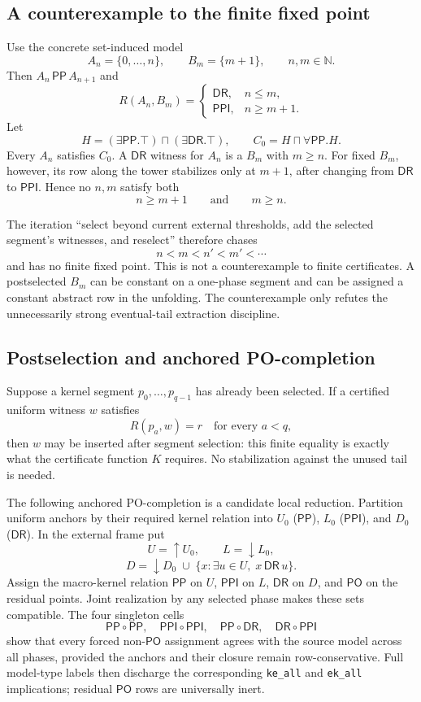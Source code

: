 \documentclass[11pt]{article}
\newcommand{\PP}{\mathsf{PP}}
\newcommand{\PPI}{\mathsf{PPI}}
\newcommand{\PO}{\mathsf{PO}}
\newcommand{\DR}{\mathsf{DR}}
\begin{document}
\subsection{A counterexample to the finite fixed point}

Use the concrete set-induced model
\[
  A_n=\{0,\ldots,n\},\qquad B_m=\{m+1\},\qquad n,m\in\mathbb{N}.
\]
Then $A_n\,\PP\,A_{n+1}$ and
\[
R(A_n,B_m)=
\begin{cases}
\DR,&n\leq m,\\
\PPI,&n\geq m+1.
\end{cases}
\]
Let
\[
  H=(\exists\PP.\top)\sqcap(\exists\DR.\top),\qquad
  C_0=H\sqcap\forall\PP.H.
\]
Every $A_n$ satisfies $C_0$. A $\DR$ witness for $A_n$ is a $B_m$ with $m\geq n$.
For fixed $B_m$, however, its row along the tower stabilizes only at $m+1$, after changing
from $\DR$ to $\PPI$. Hence no $n,m$ satisfy both
\[
  n\geq m+1\qquad\text{and}\qquad m\geq n.
\]

The iteration ``select beyond current external thresholds, add the selected segment's
witnesses, and reselect'' therefore chases
\[
  n<m<n'<m'<\cdots
\]
and has no finite fixed point. This is not a counterexample to finite certificates. A
postselected $B_m$ can be constant on a one-phase segment and can be assigned a constant
abstract row in the unfolding. The counterexample only refutes the unnecessarily strong
eventual-tail extraction discipline.

\subsection{Postselection and anchored PO-completion}

Suppose a kernel segment $p_0,\ldots,p_{q-1}$ has already been selected. If a certified
uniform witness $w$ satisfies
\[
  R(p_a,w)=r\quad\text{for every }a<q,
\]
then $w$ may be inserted after segment selection: this finite equality is exactly what the
certificate function $K$ requires. No stabilization against the unused tail is needed.

The following anchored PO-completion is a candidate local reduction. Partition uniform
anchors by their required kernel relation into $U_0$ ($\PP$), $L_0$ ($\PPI$), and $D_0$
($\DR$). In the external frame put
\[
  U=\uparrow U_0,\qquad L=\downarrow L_0,
\]
\[
  D=\downarrow D_0\;\cup\;\{x:\exists u\in U,\;x\,\DR\,u\}.
\]
Assign the macro-kernel relation $\PP$ on $U$, $\PPI$ on $L$, $\DR$ on $D$, and $\PO$ on
the residual points. Joint realization by any selected phase makes these sets compatible.
The four singleton cells
\[
  \PP\circ\PP,\quad \PPI\circ\PPI,\quad
  \PP\circ\DR,\quad \DR\circ\PPI
\]
show that every forced non-$\PO$ assignment agrees with the source model across all phases,
provided the anchors and their closure remain row-conservative. Full model-type labels then discharge the corresponding \texttt{ke\_all} and
\texttt{ek\_all} implications; residual $\PO$ rows are universally inert.
\end{document}

